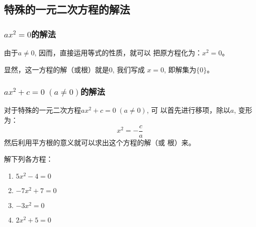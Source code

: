 \subsection{特殊的一元二次方程的解法}
\subsubsection{$ax^2=0$的解法}
由于$a\ne 0$, 因而，直接运用等式的性质，就可以
把原方程化为：$x^2=0$。

显然，这一方程的解（或根）就是0, 我们写成
$x=0$, 即解集为$\{0\}$。

\subsubsection{$ax^2+c=0\; (a\ne 0)$的解法}

对于特殊的一元二次方程$ax^2+c=0\; (a\ne 0)$, 可
以首先进行移项，除以$a$, 变形为：
\[x^2=-\frac{c}{a}\]
然后利用平方根的意义就可以求出这个方程的解（或
根）来。

\begin{example}
    解下列各方程：
\begin{multicols}{2}
\begin{enumerate}
    \item $5x^2-4=0$
    \item $-7x^2+7=0$
    \item $-3x^2=0$
    \item $2x^2+5=0$
\end{enumerate}
\end{multicols}
\end{example}

